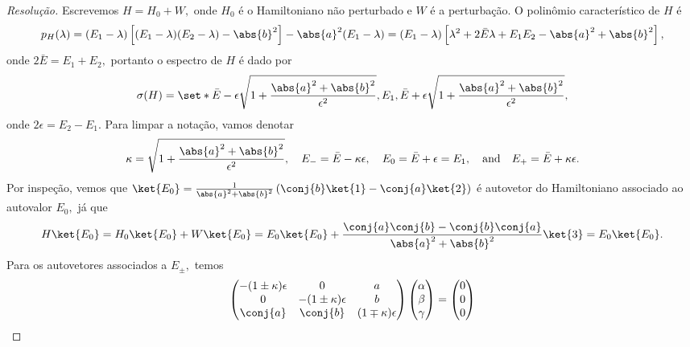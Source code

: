 \begin{proof}[Resolução]
    Escrevemos \(H = H_0 + W,\) onde \(H_0\) é o Hamiltoniano não perturbado e \(W\) é a perturbação. O polinômio característico de \(H\) é
    \begin{equation*}
        p_H(\lambda) = (E_1 - \lambda) \left[(E_1 - \lambda) (E_2 - \lambda) - \abs{b}^2\right] - \abs{a}^2 (E_1 - \lambda) = (E_1 - \lambda) \left[\lambda^2 + 2\bar{E} \lambda + E_1 E_2 - \abs{a}^2 + \abs{b}^2\right],
    \end{equation*}
    onde \(2\bar{E} = E_1 + E_2,\) portanto o espectro de \(H\) é dado por
    \begin{equation*}
        \sigma(H) = \set*{\bar{E} - \epsilon\sqrt{1 + \frac{\abs{a}^2 + \abs{b}^2}{\epsilon^2}}, E_1, \bar{E} + \epsilon\sqrt{1 + \frac{\abs{a}^2 + \abs{b}^2}{\epsilon^2}}},
    \end{equation*}
    onde \(2\epsilon = E_2 - E_1\). Para limpar a notação, vamos denotar 
    \begin{equation*}
        \kappa = \sqrt{1 + \frac{\abs{a}^2 + \abs{b}^2}{\epsilon^2}},\quad
        E_- = \bar{E} - \kappa \epsilon,\quad
        E_0 = \bar{E} + \epsilon = E_1,\quad\text{and}\quad
        E_+ = \bar{E} + \kappa \epsilon.
    \end{equation*}
    Por inspeção, vemos que \(\ket{E_0} = \frac{1}{\abs{a}^2 + \abs{b}^2}\left(\conj{b}\ket{1} - \conj{a}\ket{2}\right)\) é autovetor do Hamiltoniano associado ao autovalor \(E_0,\) já que
    \begin{equation*}
        H\ket{E_0} = H_0 \ket{E_0} + W\ket{E_0} = E_0 \ket{E_0} + \frac{\conj{a}\conj{b} - \conj{b}\conj{a}}{\abs{a}^2 + \abs{b}^2}\ket{3} = E_0 \ket{E_0}.
    \end{equation*}
    Para os autovetores associados a \(E_\pm,\) temos
    \begin{equation*}
        \begin{pmatrix}
            -(1 \pm \kappa) \epsilon & 0 & a\\
           0 & -(1 \pm \kappa) \epsilon& b\\
           \conj{a} & \conj{b} & (1 \mp \kappa) \epsilon
        \end{pmatrix}
        \begin{pmatrix}
            \alpha\\
            \beta\\
            \gamma
        \end{pmatrix} = \begin{pmatrix}
        0\\0\\0

\end{pmatrix}
\end{equation*}
\end{proof}
